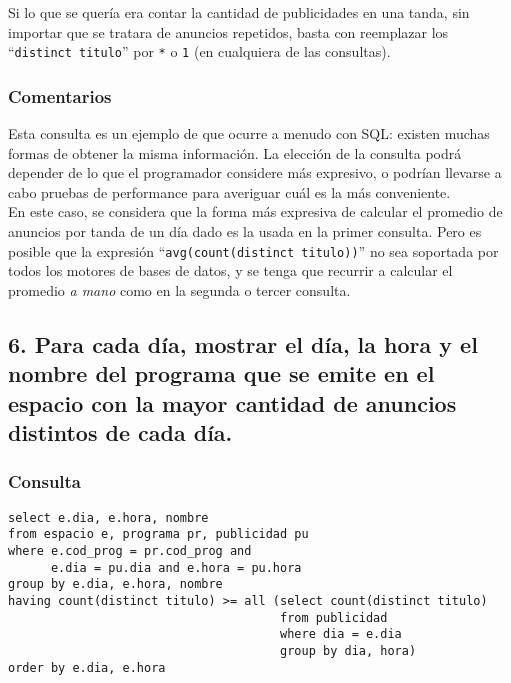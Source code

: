 Si lo que se quería era contar la cantidad de publicidades en una tanda, sin importar que se tratara de anuncios repetidos, basta con reemplazar los ``\lstinline|distinct titulo|'' por \lstinline|*| o \lstinline|1| (en cualquiera de las consultas).

\subsubsection*{Comentarios}
Esta consulta es un ejemplo de que ocurre a menudo con SQL: existen muchas formas de obtener la misma información. La elección de la consulta podrá depender de lo que el programador considere más expresivo, o podrían llevarse a cabo pruebas de performance para averiguar cuál es la más conveniente. \\

En este caso, se considera que la forma más expresiva de calcular el promedio de anuncios por tanda de un día dado es la usada en la primer consulta. Pero es posible que la expresión ``\lstinline|avg(count(distinct titulo))|'' no sea soportada por todos los motores de bases de datos, y se tenga que recurrir a calcular el promedio \textit{a mano} como en la segunda o tercer consulta.


\subsection*{6. \normalsize{Para cada d\'ia, mostrar el d\'ia, la hora y el nombre del programa que se emite en el espacio con la mayor cantidad de anuncios distintos de cada d\'ia.}}

\subsubsection*{Consulta}
\begin{lstlisting} 
select e.dia, e.hora, nombre
from espacio e, programa pr, publicidad pu
where e.cod_prog = pr.cod_prog and 
      e.dia = pu.dia and e.hora = pu.hora
group by e.dia, e.hora, nombre
having count(distinct titulo) >= all (select count(distinct titulo) 
                                      from publicidad 
                                      where dia = e.dia 
                                      group by dia, hora)
order by e.dia, e.hora
\end{lstlisting}

